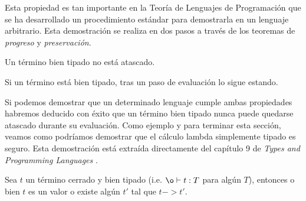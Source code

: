 Esta propiedad es tan importante en la Teoría de Lenguajes de Programación que se ha desarrollado un procedimiento estándar para demostrarla en un lenguaje arbitrario. Esta demostración se realiza en dos pasos a
través de los teoremas de \textit{progreso} y \textit{preservación}.

\begin{theorem}[Progreso]
  Un término bien tipado no está atascado.
\end{theorem}

\begin{theorem}[Preservación]
  Si un término está bien tipado, tras un paso de evaluación lo sigue estando.
\end{theorem}

Si podemos demostrar que un determinado lenguaje cumple ambas propiedades habremos deducido con éxito que un término bien tipado nunca puede quedarse atascado durante su evaluación. Como ejemplo y para terminar esta sección, veamos como podríamos demostrar que el cálculo lambda simplemente tipado es seguro. Esta demostración está extraída directamente del capítulo 9 de \textit{Types and Programming Languages} \cite{TPL}.\\

\begin{theorem}
\label{theo:prog_lambda}
  Sea $t$ un término cerrado y bien tipado (i.e. $\o |- t:T$ para algún $T$), entonces o bien $t$ es un valor o existe algún $t'$ tal que $t -> t'$.
\end{theorem}

